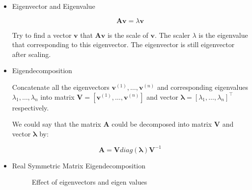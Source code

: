 \begin{itemize}
  \item Eigenvector and Eigenvalue

  \begin{equation} \tag{2.39}
    \label{eq_2_39}
    \bm{Av} = \lambda \bm{v}
  \end{equation}

  Try to find a vector $\bm{v}$ that $\bm{Av}$ is the scale of $\bm{v}$.
    The scaler $\lambda$ is the eigenvalue that corresponding to this eigenvector.
    The eigenvector is still eigenvector after scaling.

  \item Eigendecomposition

  Concatenate all the eigenvectors $\bm{v} ^ {(1)} , \ldots , \bm{v} ^ {(n)}$
    and corresponding eigenvalues $\lambda _ {1} , \ldots , \lambda _ {n}$
    into matrix $\bm{V} = [ \bm{v} ^ {(1)} , \ldots , \bm{v} ^ {(n)} ]$
    and vector ${\bm{\lambda} = [ \lambda _ {1} , \ldots , \lambda _ {n} ]} ^ \top$
    respectively.

  We could say that the matrix $\bm{A}$ could be decomposed into matrix $\bm{V}$ and vector $\bm{\lambda}$ by:

  \begin{equation} \tag{2.40}
    \label{eq_2_40}
    \bm{A} = \bm{V} diag(\bm{\lambda}) \bm{V} ^ {-1}
  \end{equation}

  \newpage

  \item Real Symmetric Matrix Eigendecomposition

  \setcounter{figure}{2}
  \begin{figure}[ht]
    \begin{center}
      Effect of eigenvectors and eigen values\par
\end{center}
\end{figure}
\end{itemize}
